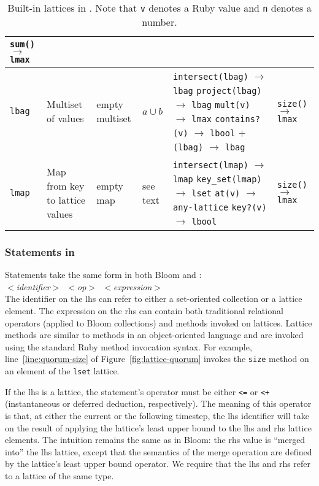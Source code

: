 \begin{table*}[t]
\begin{center}
\begin{tabular}{|l|p{0.98in}|l|l|p{1.72in}|p{1.18in}|}
\texttt{sum()} $\to$ \texttt{lmax} \\
\hline
\texttt{lbag} & Multiset of values & empty multiset & $a \cup b$ &
\texttt{intersect(lbag)} $\to$ \texttt{lbag}\newline
\texttt{project(lbag)} $\to$ \texttt{lbag}\newline
\texttt{mult(v)} $\to$ \texttt{lmax}\newline
\texttt{contains?(v)} $\to$ \texttt{lbool}\newline
\texttt{$\mathtt{+}$(lbag)} $\to$ \texttt{lbag}
& \texttt{size()} $\to$ \texttt{lmax}\\
\hline
\texttt{lmap} & Map from key to lattice values & empty map & see text&
\texttt{intersect(lmap)} $\to$ \texttt{lmap}\newline
\texttt{key\_set(lmap)} $\to$ \texttt{lset}\newline
\texttt{at(v)} $\to$ \texttt{any-lattice}\newline
\texttt{key?(v)} $\to$ \texttt{lbool}
& \texttt{size()} $\to$ \texttt{lmax}\\
\hline
\end{tabular}
\caption{Built-in lattices in \lang. Note that \texttt{v} denotes a Ruby value
  and \texttt{n} denotes a number.}
\label{tbl:built-in-lattices}
\end{center}
\end{table*}


\subsubsection{Statements in \lang}
Statements take the same form in both Bloom and \lang: \\ \noindent
\mbox{\hspace{0.25in}\emph{$<$identifier$>$ $<$op$>$
    $<$expression$>$}}\\ \noindent
The identifier on the lhs can refer to either a set-oriented collection or a
lattice element. The expression on the rhs can contain both traditional
relational operators (applied to Bloom collections) and methods invoked on
lattices.  Lattice methods are similar to methods in an object-oriented language
and are invoked using the standard Ruby method invocation syntax. For example,
line~\ref{line:quorum-size} of Figure~\ref{fig:lattice-quorum} invokes the
\texttt{size} method on an element of the \texttt{lset} lattice.

If the lhs is a lattice, the statement's operator must be either \verb|<=| or
\verb|<+| (instantaneous or deferred deduction, respectively). The meaning of
this operator is that, at either the current or the following timestep, the lhs
identifier will take on the result of applying the lattice's least upper bound
to the lhs and rhs lattice elements. The intuition remains the same as in Bloom:
the rhs value is ``merged into'' the lhs lattice, except that the semantics of
the merge operation are defined by the lattice's least upper bound operator. We
require that the lhs and rhs refer to a lattice of the same type.

